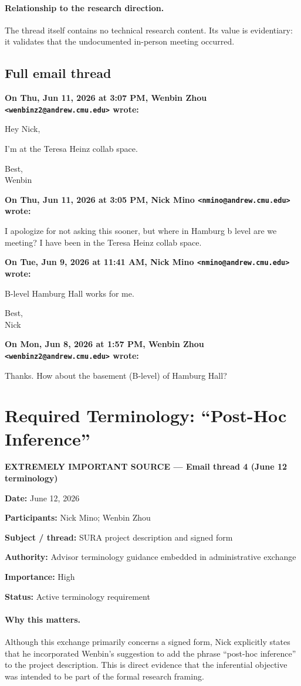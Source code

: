 \documentclass[11pt]{article}
\newcommand{\CriticalSource}[1]{%
  \par\noindent\textcolor{critical}{\textbf{EXTREMELY IMPORTANT SOURCE --- #1}}%
  \par\medskip
}
\newcommand{\Meta}[2]{%
  \par\noindent\textbf{#1:} #2\par\nobreak
}
\newcommand{\Email}[3]{%
  \medskip\noindent\textbf{On #1, #2 wrote:}\par\nobreak
  \begingroup\RaggedRight #3\par\endgroup
}
\begin{document}
\paragraph{Relationship to the research direction.}
The thread itself contains no technical research content. Its value is
evidentiary: it validates that the undocumented in-person meeting occurred.

\subsection*{Full email thread}
\Email{Thu, Jun 11, 2026 at 3:07 PM}{Wenbin Zhou
\texttt{<wenbinz2@andrew.cmu.edu>}}{%
Hey Nick,

I'm at the Teresa Heinz collab space.

Best,\\
Wenbin}

\Email{Thu, Jun 11, 2026 at 3:05 PM}{Nick Mino
\texttt{<nmino@andrew.cmu.edu>}}{%
I apologize for not asking this sooner, but where in Hamburg b level are we
meeting? I have been in the Teresa Heinz collab space.}

\Email{Tue, Jun 9, 2026 at 11:41 AM}{Nick Mino
\texttt{<nmino@andrew.cmu.edu>}}{%
B-level Hamburg Hall works for me.

Best,\\
Nick}

\Email{Mon, Jun 8, 2026 at 1:57 PM}{Wenbin Zhou
\texttt{<wenbinz2@andrew.cmu.edu>}}{%
Thanks. How about the basement (B-level) of Hamburg Hall?}

\clearpage
\section{Required Terminology: ``Post-Hoc Inference''}
\CriticalSource{Email thread 4 (June 12 terminology)}

\Meta{Date}{June 12, 2026}
\Meta{Participants}{Nick Mino; Wenbin Zhou}
\Meta{Subject / thread}{SURA project description and signed form}
\Meta{Authority}{Advisor terminology guidance embedded in administrative
exchange}
\Meta{Importance}{High}
\Meta{Status}{Active terminology requirement}

\paragraph{Why this matters.}
Although this exchange primarily concerns a signed form, Nick explicitly states
that he incorporated Wenbin's suggestion to add the phrase ``post-hoc
inference'' to the project description. This is direct evidence that the
inferential objective was intended to be part of the formal research framing.
\end{document}
